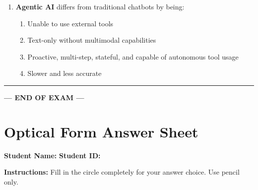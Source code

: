 \documentclass[11pt]{article}
\begin{document}
\begin{enumerate}
\item \textbf{Agentic AI} differs from traditional chatbots by being:
\begin{enumerate}[label=\Alph*)]
    \item Unable to use external tools
    \item Text-only without multimodal capabilities
    \item Proactive, multi-step, stateful, and capable of autonomous tool usage
    \item Slower and less accurate
\end{enumerate}

\end{enumerate}

\vspace{1cm}
\hrule
\vspace{0.5cm}

\begin{center}
\textbf{--- END OF EXAM ---}
\end{center}

\newpage
\section*{Optical Form Answer Sheet}

\noindent\textbf{Student Name:} \underline{\hspace{6cm}} \hfill \textbf{Student ID:} \underline{\hspace{4cm}}

\vspace{1cm}

\noindent\textbf{Instructions:} Fill in the circle completely for your answer choice. Use pencil only.

\vspace{1cm}
\end{document}
